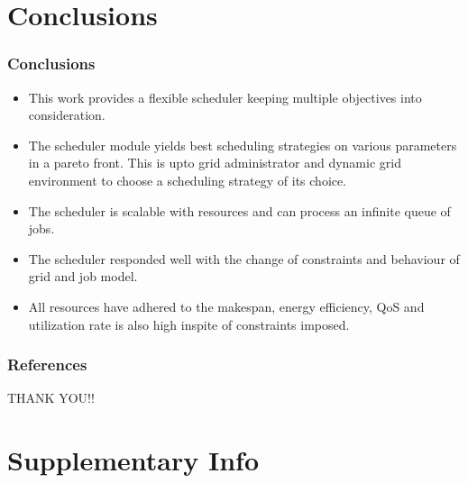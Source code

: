\documentclass{beamer}
\newcommand\Fontdi{\fontsize{10}{6}\selectfont}
\newcommand\Fontci{\fontsize{4}{4}\selectfont}
\newcommand\Fontti{\fontsize{25}{15}\selectfont}
\begin{document}
\section[Conclusions]{Conclusions}
\begin{frame}
\frametitle{Conclusions}
\Fontdi
\begin{itemize}
  \item This work provides a flexible scheduler keeping multiple objectives into consideration. 
  \item The scheduler module yields best scheduling strategies on various parameters in a pareto front. This is upto grid administrator and dynamic grid environment to choose a scheduling strategy of its choice.
  \item The scheduler is scalable with resources and can process an infinite queue of jobs. 
  \item The scheduler responded well with the change of constraints and behaviour of grid and job model. 
  \item All resources have adhered to the makespan, energy efficiency, QoS and utilization rate is also high inspite of constraints imposed.
\end{itemize}
\end{frame}


\begin{frame}[allowframebreaks]
  \frametitle{References}
  
  \Fontci
  
\end{frame}

\begin{frame}
 \begin{center}
  \Fontti
  THANK YOU!!
 \end{center}
\end{frame}

\section{Supplementary Info}
\end{document}
